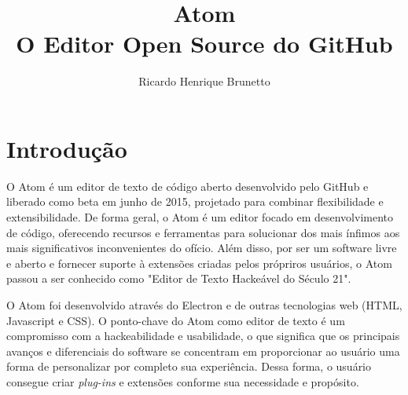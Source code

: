 

\sloppy

\title{Atom\\O Editor Open Source do GitHub}

\author{Ricardo Henrique Brunetto}


\address{Departamento de Informática -- Universidade Estadual de Maringá (UEM)\\
	Maringá -- PR -- Brasil
}



	\maketitle

	{}

	\newpage
	\tableofcontents
	\newpage

  \section{Introdução}\label{sec:intro}
	O Atom é um editor de texto de código aberto desenvolvido pelo GitHub e liberado como beta em junho de 2015, projetado para combinar flexibilidade e extensibilidade. De forma geral, o Atom é um editor focado em desenvolvimento de código, oferecendo recursos e ferramentas para solucionar dos mais ínfimos aos mais significativos inconvenientes do ofício. Além disso, por ser um software livre e aberto e fornecer suporte à extensões criadas pelos própriros usuários, o Atom passou a ser conhecido como "Editor de Texto Hackeável do Século 21".

	O Atom foi desenvolvido através do Electron e de outras tecnologias web (HTML, Javascript e CSS). O ponto-chave do Atom como editor de texto é um compromisso com a hackeabilidade e usabilidade, o que significa que os principais avanços e diferenciais do software se concentram em proporcionar ao usuário uma forma de personalizar por completo sua experiência. Dessa forma, o usuário consegue criar \textit{plug-ins} e extensões conforme sua necessidade e propósito.

